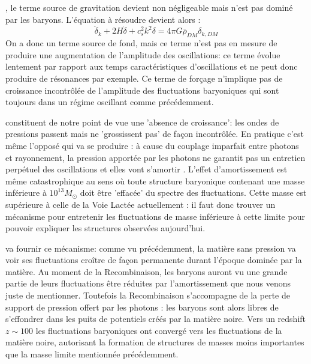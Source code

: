 , le terme source de gravitation devient non négligeable mais n'est pas dominé par les baryons. L'équation à résoudre devient alors :
\begin{equation}
\ddot \delta_k+2H\dot \delta +c_s^2k^2 \delta = 4\pi G \bar\rho_{DM} \delta_{k,DM}
\end{equation}
On a donc un terme source de fond, mais ce terme n'est pas en mesure de produire une augmentation de l'amplitude des oscillations: ce terme évolue lentement par rapport aux temps caractéristiques d'oscillations et ne peut donc produire de résonances par exemple. Ce terme de forçage n'implique pas de croissance incontrôlée de l'amplitude des fluctuations baryoniques qui sont toujours dans un régime oscillant comme précédemment.

 constituent de notre point de vue une 'absence de croissance': les ondes de pressions passent mais ne 'grossissent pas' de façon incontrôlée. En pratique c'est même l'opposé qui va se produire : à cause du couplage imparfait entre photons et rayonnement, la pression apportée par les photons ne garantit pas un entretien perpétuel des oscillations et elles vont s'amortir . L'effet d'amortissement est même catastrophique au sens où toute structure baryonique contenant une masse inférieure à $10^{13} M_\odot$  doit être 'effacée' du spectre des fluctuations. Cette masse est supérieure à celle de la Voie Lactée actuellement : il faut donc trouver un mécanisme pour entretenir les fluctuations de masse inférieure à cette limite pour pouvoir expliquer les structures observées aujourd'hui.

 va fournir ce mécanisme: comme vu précédemment, la matière sans pression va voir ses fluctuations croître de façon permanente durant l'époque dominée par la matière. Au moment de la Recombinaison, les baryons auront vu une grande partie de leurs fluctuations être réduites par l'amortissement que nous venons juste de mentionner. Toutefois la Recombinaison s'accompagne de la perte de support de pression offert par les photons : les baryons sont alors libres de s'effondrer dans les puits de potentiels créés par la matière noire. Vers un redshift $z\sim 100$ les fluctuations baryoniques ont convergé vers les fluctuations de la matière noire, autorisant la formation de structures de masses moins importantes que la masse limite mentionnée précédemment.

